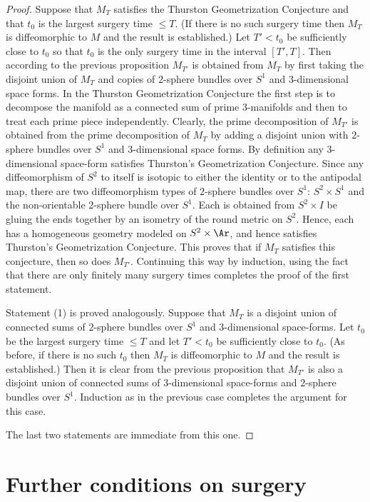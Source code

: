 \begin{proof}
Suppose that $M_T$ satisfies the Thurston Geometrization Conjecture and that $t_0$ is
the largest surgery time $\le T$. (If there is no such surgery time
then $M_T$ is diffeomorphic to $M$ and the result is established.)
Let $T'<t_0$ be sufficiently close to $t_0$ so that
$t_0$ is the only surgery time in the interval $[T',T]$. Then according to
the previous proposition $M_{T'}$ is obtained from $M_T$ by first taking the disjoint union
 of $M_T$ and copies of $2$-sphere bundles over $S^1$ and $3$-dimensional space forms.
 In the Thurston Geometrization Conjecture the first step is to decompose the manifold as
 a connected sum of prime $3$-manifolds and then to treat each prime piece independently.
 Clearly, the prime decomposition of $M_{T'}$ is obtained from the prime decomposition of $M_T$
 by adding a disjoint union with $2$-sphere bundles over $S^1$ and $3$-dimensional space forms.
 By definition
 any $3$-dimensional space-form satisfies Thurston's Geometrization Conjecture.
 Since any diffeomorphism of $S^2$ to itself is isotopic to either the identity
 or to the antipodal map, there are two diffeomorphism types of $2$-sphere bundles over
 $S^1$: $S^2\times S^1$ and the non-orientable $2$-sphere bundle over $S^1$.
 Each is obtained from $S^2\times I$ be gluing the ends together by an isometry of the round
 metric on $S^2$. Hence, each has a homogeneous geometry modeled on $S^2\times \Ar$, and hence
 satisfies Thurston's Geometrization Conjecture. This proves that if $M_T$ satisfies this
 conjecture, then so does $M_{T'}$. Continuing this way by induction, using the fact that there
 are only finitely many surgery times completes the proof of the first statement.

Statement (1) is proved analogously. Suppose that $M_T$ is a disjoint union of
connected sums of $2$-sphere bundles over $S^1$
and $3$-dimensional space-forms. Let $t_0$ be
the largest surgery time $\le T$ and let $T'<t_0$ be sufficiently close to $t_0$.
(As before, if there is no such $t_0$ then $M_T$ is diffeomorphic to $M$ and the result is
established.) Then it is clear from the previous proposition that $M_{T'}$ is also a disjoint
union of connected sums of $3$-dimensional space-forms and $2$-sphere bundles over $S^1$.
Induction as in the previous case completes the argument for this case.

The last two statements are immediate from this one.
\end{proof}

\section{Further conditions on surgery}




